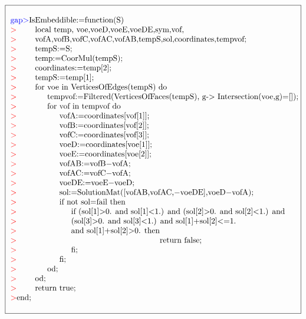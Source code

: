 \documentclass[12pt,titlepage,twoside,cleardoublepage]{article}
\theoremstyle{nummermitklammern}
\numberwithin{equation}{section}
\begin{document}
\begin{center}
$
   \fbox{
\parbox{13.4cm}{
\begin{tabbing}
\textcolor{blue}{gap$>$}Is\=Embeddible:=function(S)\\
\textcolor{red}{$>$}\>local temp, voe,voeD,voeE,voeDE,sym,vof,\\
\textcolor{red}{$>$}\>vofA,vofB,vofC,vofAC,vofAB,tempS,sol,coordinates,tempvof;\\
\textcolor{red}{$>$}\>tempS:=S;\\
\textcolor{red}{$>$}\>temp:=CoorMul(tempS);\\
\textcolor{red}{$>$}\>coordinates:=temp[2];\\
\textcolor{red}{$>$}\>tempS:=temp[1];\\
\textcolor{red}{$>$}\>for \=voe in VerticesOfEdges(tempS) do\\
\textcolor{red}{$>$}\>\> tempvof:=Filtered(VerticesOfFaces(tempS),
g-$>$ Intersection(voe,g)=[]);\\
\textcolor{red}{$>$}\>\>for \=vof in tempvof do\\
\textcolor{red}{$>$}\>\>\>vofA:=coordinates[vof[1]];\\
\textcolor{red}{$>$}\>\>\>vofB:=coordinates[vof[2]];\\
\textcolor{red}{$>$}\>\>\>vofC:=coordinates[vof[3]];\\
\textcolor{red}{$>$}\>\>\>voeD:=coordinates[voe[1]];\\
\textcolor{red}{$>$}\>\>\>voeE:=coordinates[voe[2]];\\
\textcolor{red}{$>$}\>\>\>vofAB:=vofB$-$vofA;\\
\textcolor{red}{$>$}\>\>\>vofAC:=vofC$-$vofA;\\
\textcolor{red}{$>$}\>\>\>voeDE:=voeE$-$voeD;\\
\textcolor{red}{$>$}\>\>\>sol:=SolutionMat([vofAB,vofAC,$-$voeDE],voeD$-$vofA);\\
\textcolor{red}{$>$}\>\>\>if n\=ot sol=fail then\\
\textcolor{red}{$>$}\>\>\>\>if (sol[1]$>$0. and sol[1]$<$1.) and (sol[2]$>$0. and sol[2]$<$1.) and \\
\textcolor{red}{$>$}\>\>\>\>(sol[3]$>$0.
and sol[3]$<$1.) and sol[1]+sol[2]$<$=1. \\
\textcolor{red}{$>$}\>\>\>\>and sol[1]+sol[2]$>$0. then\=\\
\textcolor{red}{$>$}\>\>\>\>\>return false;\\
\textcolor{red}{$>$}\>\>\>\>fi;\\
\textcolor{red}{$>$}\>\>\>fi;\\
\textcolor{red}{$>$}\>\>od;\\
\textcolor{red}{$>$}\>od;\\
\textcolor{red}{$>$}\>return true;\\
\textcolor{red}{$>$}end;
\end{tabbing}
}}$
\end{center}
\end{document}
